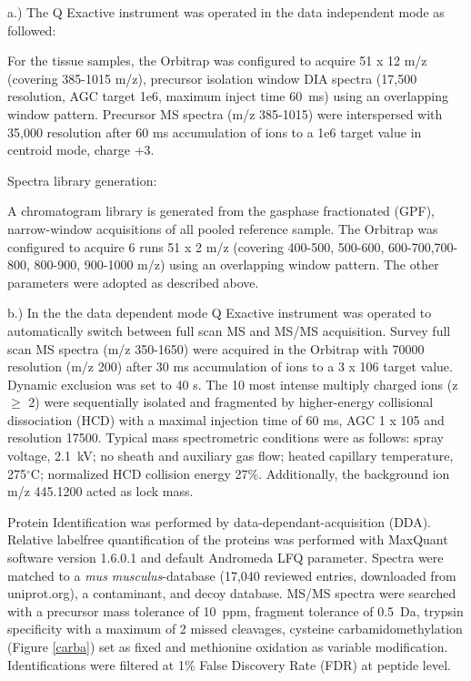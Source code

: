 \documentclass[a4paper,11pt,bibtotocnumbered]{article}
\begin{document}
a.) The Q Exactive instrument was operated in the data independent mode as followed:

For the tissue samples, the Orbitrap was configured to acquire 51 x 12 m/z (covering 385-1015 m/z), precursor isolation window DIA spectra (17,500 resolution, AGC target 1e6, maximum inject time 60~ms) using an overlapping window pattern. Precursor MS spectra (m/z 385-1015) were interspersed with 35,000 resolution after 60 ms accumulation of ions to a 1e6 target value in centroid mode, charge +3.

Spectra library generation:

A chromatogram library is generated from the gasphase fractionated (GPF), narrow-window acquisitions of all pooled reference sample. The Orbitrap was configured to acquire 6 runs 51 x 2 m/z (covering 400-500, 500-600, 600-700,700-800, 800-900, 900-1000 m/z) using an overlapping window pattern. The other parameters were adopted as described above.

b.) In the the data dependent mode Q Exactive instrument was operated to automatically switch between full scan MS and MS/MS acquisition. Survey full scan MS spectra (m/z 350-1650) were acquired in the Orbitrap with 70000 resolution (m/z 200) after 30 ms accumulation of ions to a 3 x 106 target value. Dynamic exclusion was set to 40 s. The 10 most intense multiply charged ions (z $\geq$ 2) were sequentially isolated and fragmented by higher-energy collisional dissociation (HCD) with a maximal injection time of 60 ms, AGC 1 x 105 and resolution 17500. Typical mass spectrometric conditions were as follows: spray voltage, 2.1~kV; no sheath and auxiliary gas flow; heated capillary temperature, 275$^\circ$C; normalized HCD collision energy 27\%.
Additionally, the background ion m/z 445.1200 acted as lock mass.


Protein Identification was performed by data-dependant-acquisition (DDA). 
Relative labelfree quantification of the proteins was performed with MaxQuant software version 1.6.0.1 and default Andromeda LFQ parameter. Spectra were matched to a \textit{mus musculus}-database (17,040 reviewed entries, downloaded from uniprot.org), a contaminant, and decoy database. MS/MS spectra were searched with a precursor mass tolerance of 10~ppm, fragment tolerance of 0.5~Da, trypsin specificity with a maximum of 2 missed cleavages, cysteine carbamidomethylation (Figure \ref{carba}) set as fixed and methionine oxidation as variable modification. Identifications were filtered at 1\% False Discovery Rate (FDR) at peptide level.
\end{document}
